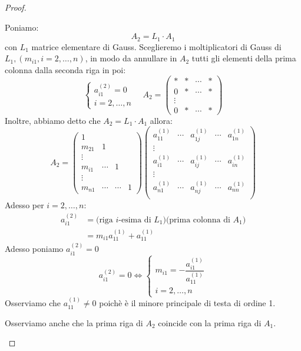 \documentclass[12pt]{report}
\begin{document}
\begin{proof}
\begin{enumerate}
		Poniamo:
		\[
		A_2 = L_1 \cdot A_1
		\]
		con $L_1$ matrice elementare di Gauss. Sceglieremo i moltiplicatori di Gauss di $L_1, (m_{i1}, i = 2, \dots, n)$, in modo da annullare in $A_2$ tutti gli elementi della prima colonna dalla seconda riga in poi:
		\[
		\begin{cases}
		a^{(2)}_{i1} = 0 \\
		i = 2, \dots, n
		\end{cases} \quad A_2 = \begin{pmatrix}
			* & * & \cdots & * \\
			0 & * & \cdots & * \\
			\vdots \\
			0 & * &  \cdots  & *
		\end{pmatrix}
		\]
		Inoltre, abbiamo detto che $A_2 = L_1 \cdot A_1$ allora:
		\[
		A_2 = \begin{pmatrix}
			1  \\
			m_{21} & 1 \\
			\vdots \\
			m_{i1} & \cdots & 1 \\
			\vdots \\
			m_{n1} & \cdots & \cdots & 1
		\end{pmatrix}\begin{pmatrix}
			a^{(1)}_{11} & \cdots & a^{(1)}_{1j} & \cdots & a^{(1)}_{1n} \\
			\vdots  \\
			a^{(1)}_{i1} & \cdots & a^{(1)}_{ij} & \cdots & a^{(1)}_{in} \\
			\vdots \\
			a^{(1)}_{n1} & \cdots & a^{(1)}_{nj} & \cdots & a^{(1)}_{nn} \\
		\end{pmatrix}
		\]
		Adesso per $i = 2, \dots, n$:
		\begin{align*}
			a^{(2)}_{i1} &= \text{(riga $i$-esima di $L_1$)(prima colonna di $A_1$)} \\
			&= m_{i1}a^{(1)}_{11} + a^{(1)}_{11}
		\end{align*}
		Adesso poniamo $a^{(2)}_{i1} = 0$
		\[
		a^{(2)}_{i1} = 0 \iff \begin{cases}
			m_{i1} = -\dfrac{a^{(1)}_{i1}}{a^{(1)}_{11}} \\
			i = 2, \dots, n
		\end{cases}
		\]
		Osserviamo che $a^{(1)}_{11} \neq 0$ poichè è il minore principale di testa di ordine 1.

		Osserviamo anche che la prima riga di $A_2$ coincide con la prima riga di $A_1$.


\end{enumerate}
\end{proof}
\end{document}
